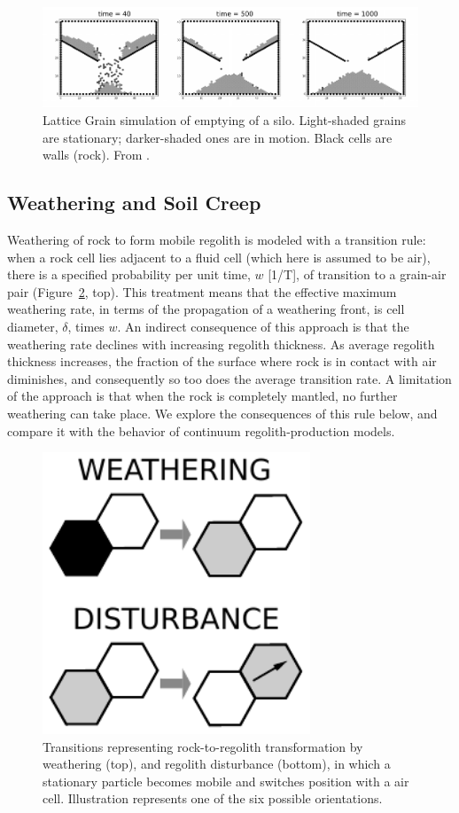 \documentclass[esurf, manuscript]{copernicus}
\begin{document}
\begin{figure}[t]
\includegraphics[width=12cm]{Figures/lattice_grain_silo.pdf}
\caption{Lattice Grain simulation of emptying of a silo. Light-shaded grains are stationary; darker-shaded ones are in motion. Black cells are walls (rock). From \citet{tucker2016celllab}.}
\label{silo}
\end{figure}

\subsection{Weathering and Soil Creep}

Weathering of rock to form mobile regolith is modeled with a transition rule: when a rock cell lies adjacent to a fluid cell (which here is assumed to be air), there is a specified probability per unit time, $w$ [1/T], of transition to a grain-air pair (Figure~\ref{wxdist}, top). This treatment means that the effective maximum weathering rate, in terms of the propagation of a weathering front, is cell diameter, $\delta$, times $w$. An indirect consequence of this approach is that the weathering rate declines with increasing regolith thickness. As average regolith thickness increases, the fraction of the surface where rock is in contact with air diminishes, and consequently so too does the average transition rate. A limitation of the approach is that when the rock is completely mantled, no further weathering can take place. We explore the consequences of this rule below, and compare it with the behavior of continuum regolith-production models.

\begin{figure}[t]
\includegraphics[width=8cm]{Figures/grain_hill_weathering_disturbance.pdf}
\caption{Transitions representing rock-to-regolith transformation by weathering (top), and regolith disturbance (bottom), in which a stationary particle becomes mobile and switches position with a air cell. Illustration represents one of the six possible orientations.}
\label{wxdist}
\end{figure}
\end{document}
